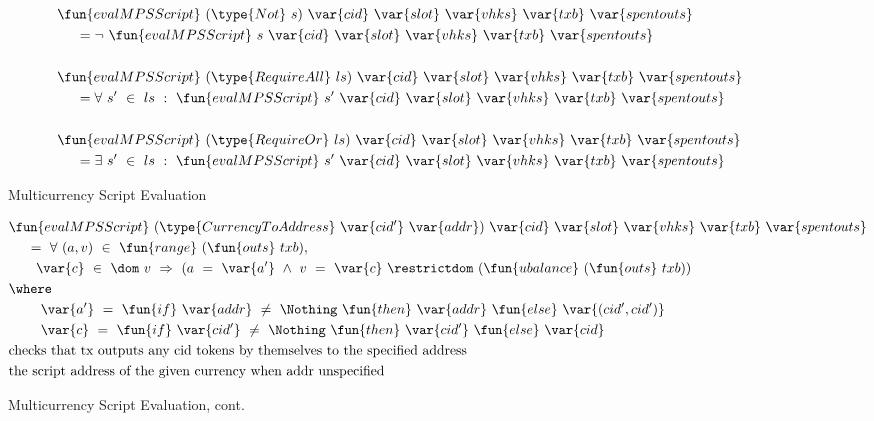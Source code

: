 \begin{figure*}[htb]
\begin{align*}
    &\fun{evalMPSScript}~(\type{Not}~s)~\var{cid}~\var{slot}~\var{vhks}
    ~\var{txb}~\var{spentouts}
   \\
    &~~~~ = \neg ~\fun{evalMPSScript}~s~\var{cid}~\var{slot}~\var{vhks}
    ~\var{txb}~\var{spentouts}\\~\\
    &\fun{evalMPSScript}~(\type{RequireAll}~ls)~\var{cid}~\var{slot}~\var{vhks}
    ~\var{txb}~\var{spentouts}
   \\
    &~~~~ = \forall ~s'~ \in~ ls~:~\fun{evalMPSScript}~s'~\var{cid}~\var{slot}~\var{vhks}
    ~\var{txb}~\var{spentouts}\\~\\
    &\fun{evalMPSScript}~(\type{RequireOr}~ls)~\var{cid}~\var{slot}~\var{vhks}
    ~\var{txb}~\var{spentouts}
   \\
    &~~~~ = \exists ~s'~ \in~ ls~:~\fun{evalMPSScript}~s'~\var{cid}~\var{slot}~\var{vhks}
    ~\var{txb}~\var{spentouts}\\
  \end{align*}
  \caption{Multicurrency Script Evaluation}
  \label{fig:defs:tx-mc-eval}
\end{figure*}



\begin{figure*}[htb]
  \begin{align*}
    & \fun{evalMPSScript}
     ~(\type{CurrencyToAddress}~\var{cid'}~\var{addr})~\var{cid}~ \var{slot}~\var{vhks} ~\var{txb}~\var{spentouts} \\
    &~~~~ =~ \forall~(a, v)~\in~\fun{range}~(\fun{outs}~txb),~\\
    &~~~~~~ \var{c}~\in~\dom~v~\Rightarrow~(a~=~ \var{a'} ~\wedge~
                       v~=~\var{c}~ \restrictdom~(\fun{ubalance}~(\fun{outs}~txb)) \\
    & \where \\
    & ~~~~~~~ \var{a'}~=~\fun{if}~ \var{addr}~\neq~\Nothing~\fun{then}~\var{addr}~\fun{else}~\var{(cid',cid')} \\
    & ~~~~~~~ \var{c}~=~\fun{if}~ \var{cid'}~\neq~\Nothing~\fun{then}~\var{cid'}~\fun{else}~\var{cid} \\
    & \text{checks that tx outputs any cid tokens by themselves to the specified address} \\
    & \text {the script address of the given currency when addr unspecified}
    \end{align*}
    \caption{Multicurrency Script Evaluation, cont.}
    \label{fig:defs:tx-mc-eval-2}
\end{figure*}

